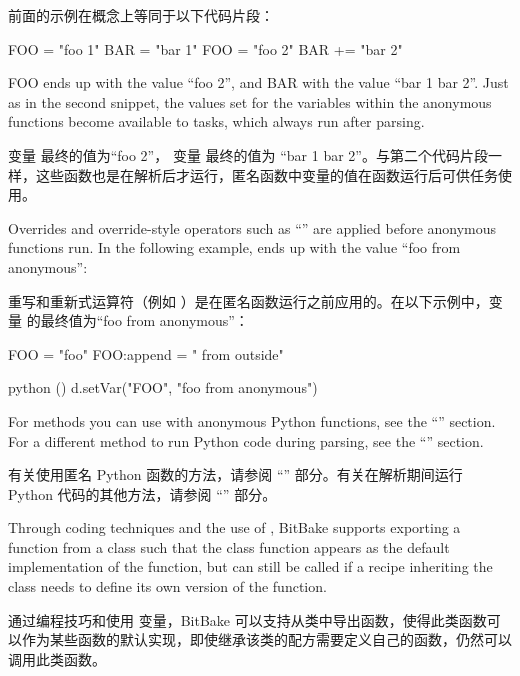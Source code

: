 前面的示例在概念上等同于以下代码片段：

\begin{pyglist}
FOO = "foo 1"
BAR = "bar 1"
FOO = "foo 2"
BAR += "bar 2"
\end{pyglist}

FOO ends up with the value ``foo 2'', and BAR with the value ``bar 1 bar 2''. Just as in the second snippet, the values set for the variables within the anonymous functions become available to tasks, which always run after parsing.

变量  最终的值为``foo 2''， 变量  最终的值为 ``bar 1 bar 2''。与第二个代码片段一样，这些函数也是在解析后才运行，匿名函数中变量的值在函数运行后可供任务使用。

Overrides and override-style operators such as ``'' are applied before anonymous functions run. In the following example,  ends up with the value ``foo from anonymous'':

重写和重新式运算符（例如 ）是在匿名函数运行之前应用的。在以下示例中，变量  的最终值为“foo from anonymous”：

\begin{pyglist}
FOO = "foo"
FOO:append = " from outside"

python () {
    d.setVar("FOO", "foo from anonymous")
}
\end{pyglist}

For methods you can use with anonymous Python functions, see the ``'' section. For a different method to run Python code during parsing, see the ``'' section.

有关使用匿名 Python 函数的方法，请参阅 ``'' 部分。有关在解析期间运行 Python 代码的其他方法，请参阅 ``'' 部分。


Through coding techniques and the use of , BitBake supports exporting a function from a class such that the class function appears as the default implementation of the function, but can still be called if a recipe inheriting the class needs to define its own version of the function.

通过编程技巧和使用  变量，BitBake 可以支持从类中导出函数，使得此类函数可以作为某些函数的默认实现，即使继承该类的配方需要定义自己的函数，仍然可以调用此类函数。

